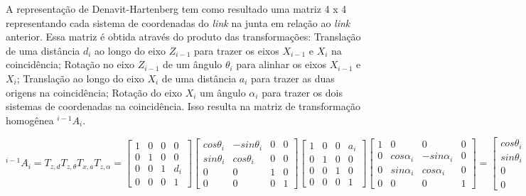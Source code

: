 A representação de Denavit-Hartenberg tem como resultado uma matriz 4 x 4 representando cada sistema de coordenadas do \textit{link} na junta em relação ao \textit{link} anterior. Essa matriz é obtida através do produto das transformações: Translação de uma distância $d_{i}$ ao longo do eixo $Z_{i-1}$ para trazer os eixos $X_{i-1}$ e $X_{i}$ na coincidência; Rotação no eixo $Z_{i-1}$ de um ângulo $\theta_{i}$ para alinhar os eixos $X_{i-1}$ e $X_{i}$; Translação ao longo do eixo $X_{i}$ de uma distância $a_{i}$ para trazer as duas origens na coincidência; Rotação do eixo $X_{i}$ um ângulo $\alpha_{i}$ para trazer os dois sistemas de coordenadas na coincidência. Isso resulta na matriz de transformação homogênea $^{i-1}A_{i}$.

\begin{equation}
^{i-1}A_{i}=T_{z,d} T_{z,\theta} T_{x,a} T_{z,\alpha}=\begin{bmatrix}
1 & 0 & 0 & 0\\ 
0 & 1 & 0 & 0\\ 
0 & 0 & 1 & d_{i}\\ 
0 & 0 & 0 & 1
\end{bmatrix}\begin{bmatrix}
cos\theta_{i} & -sin\theta_{i} & 0 & 0\\ 
sin\theta_{i} & cos\theta_{i} & 0 & 0\\ 
0 & 0 & 1 & 0\\ 
0 & 0 & 0 & 1
\end{bmatrix}\begin{bmatrix}
1 & 0 & 0 & a_{i}\\ 
0 & 1 & 0 & 0\\ 
0 & 0 & 1 & 0\\ 
0 & 0 & 0 & 1
\end{bmatrix}\begin{bmatrix}
1 & 0 & 0 & 0\\ 
0 & cos\alpha_{i} & -sin\alpha_{i} & 0\\ 
0 & sin\alpha_{i} & cos\alpha_{i} & 0\\ 
0 & 0 & 0 & 1
\end{bmatrix}=\begin{bmatrix}
cos\theta_{i} & -cos\alpha_{i}sin\alpha_{i} & sen\alpha_{i}sin\theta_{i} & a_{i}cos\theta_{i}\\ 
sin\theta_{i} & cos\alpha_{i}cos\theta_{i} & -sin\alpha_{i}cos\theta_{i} & a_{i}sin\theta_{i}\\ 
0 & sin\alpha_{i} & cos\alpha_{i} & d_{i}\\ 
0 & 0 & 0 & 1
\end{bmatrix}
\end{equation}

